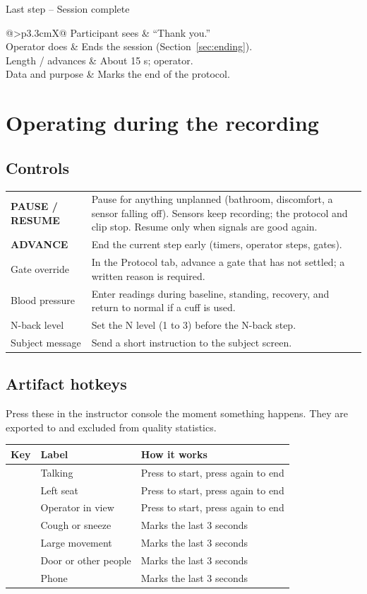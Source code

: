 \documentclass[11pt,a4paper]{article}
\makeatletter
\newcommand{\code}[1]{\texttt{\detokenize{#1}}}
\newcommand{\ui}[1]{\textsf{\textbf{#1}}}
\newcommand{\key}[1]{\fbox{\texttt{#1}}}
\newcommand{\stepdetail}[4]{%
  \begin{tabularx}{\linewidth}{@{}>{\bfseries}p{3.3cm}X@{}}
    Participant sees & #1 \\
    Operator does & #2 \\
    Length / advances & #3 \\
    Data and purpose & #4 \\
  \end{tabularx}}
\makeatother
\begin{document}
\begin{stepbox}{Last step -- Session complete}
\stepdetail{``Thank you.''}
{Ends the session (Section~\ref{sec:ending}).}
{About 15 s; operator.}
{Marks the end of the protocol.}
\end{stepbox}

\section{Operating during the recording}

\subsection{Controls}
\begin{tabularx}{\linewidth}{@{}lX@{}}
\toprule
\ui{PAUSE / RESUME} & Pause for anything unplanned (bathroom, discomfort, a sensor falling off). Sensors keep recording;
the protocol and clip stop. Resume only when signals are good again. \\
\ui{ADVANCE} & End the current step early (timers, operator steps, gates). \\
Gate override & In the Protocol tab, advance a gate that has not settled; a written reason is required. \\
Blood pressure & Enter readings during baseline, standing, recovery, and return to normal if a cuff is used. \\
N-back level & Set the N level (1 to 3) before the N-back step. \\
Subject message & Send a short instruction to the subject screen. \\
\bottomrule
\end{tabularx}

\subsection{Artifact hotkeys}
Press these in the instructor console the moment something happens. They are exported to \code{artifacts.tsv} and
excluded from quality statistics.

\begin{tabularx}{\linewidth}{@{}clX@{}}
\toprule
\textbf{Key} & \textbf{Label} & \textbf{How it works} \\
\midrule
\key{T} & Talking & Press to start, press again to end \\
\key{L} & Left seat & Press to start, press again to end \\
\key{O} & Operator in view & Press to start, press again to end \\
\key{C} & Cough or sneeze & Marks the last 3 seconds \\
\key{M} & Large movement & Marks the last 3 seconds \\
\key{D} & Door or other people & Marks the last 3 seconds \\
\key{P} & Phone & Marks the last 3 seconds \\
\bottomrule
\end{tabularx}
\end{document}
